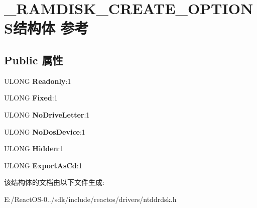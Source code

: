 \hypertarget{struct___r_a_m_d_i_s_k___c_r_e_a_t_e___o_p_t_i_o_n_s}{}\section{\+\_\+\+R\+A\+M\+D\+I\+S\+K\+\_\+\+C\+R\+E\+A\+T\+E\+\_\+\+O\+P\+T\+I\+O\+N\+S结构体 参考}
\label{struct___r_a_m_d_i_s_k___c_r_e_a_t_e___o_p_t_i_o_n_s}
\subsection*{Public 属性}
\begin{DoxyCompactItemize}
\item 
\mbox{\label{struct___r_a_m_d_i_s_k___c_r_e_a_t_e___o_p_t_i_o_n_s_aa1efb7c3dea8bf86a252d5ba2c0d3300}} 
U\+L\+O\+NG {\bfseries Readonly}\+:1
\item 
\mbox{\label{struct___r_a_m_d_i_s_k___c_r_e_a_t_e___o_p_t_i_o_n_s_aa728fbfc3b602850bd15d8e60bd82be4}} 
U\+L\+O\+NG {\bfseries Fixed}\+:1
\item 
\mbox{\label{struct___r_a_m_d_i_s_k___c_r_e_a_t_e___o_p_t_i_o_n_s_a9c70070214ed2acf74d6fc8513a3ed78}} 
U\+L\+O\+NG {\bfseries No\+Drive\+Letter}\+:1
\item 
\mbox{\label{struct___r_a_m_d_i_s_k___c_r_e_a_t_e___o_p_t_i_o_n_s_a6339ba87b1b867869f507bc3e4212f39}} 
U\+L\+O\+NG {\bfseries No\+Dos\+Device}\+:1
\item 
\mbox{\label{struct___r_a_m_d_i_s_k___c_r_e_a_t_e___o_p_t_i_o_n_s_a7de1d85fea0fa57086273e13dd23c414}} 
U\+L\+O\+NG {\bfseries Hidden}\+:1
\item 
\mbox{\label{struct___r_a_m_d_i_s_k___c_r_e_a_t_e___o_p_t_i_o_n_s_a1b991d2a2ed2a642a3d1b8dec6435459}} 
U\+L\+O\+NG {\bfseries Export\+As\+Cd}\+:1
\end{DoxyCompactItemize}


该结构体的文档由以下文件生成\+:\begin{DoxyCompactItemize}
\item 
E\+:/\+React\+O\+S-\/0../sdk/include/reactos/drivers/ntddrdsk.\+h\end{DoxyCompactItemize}
